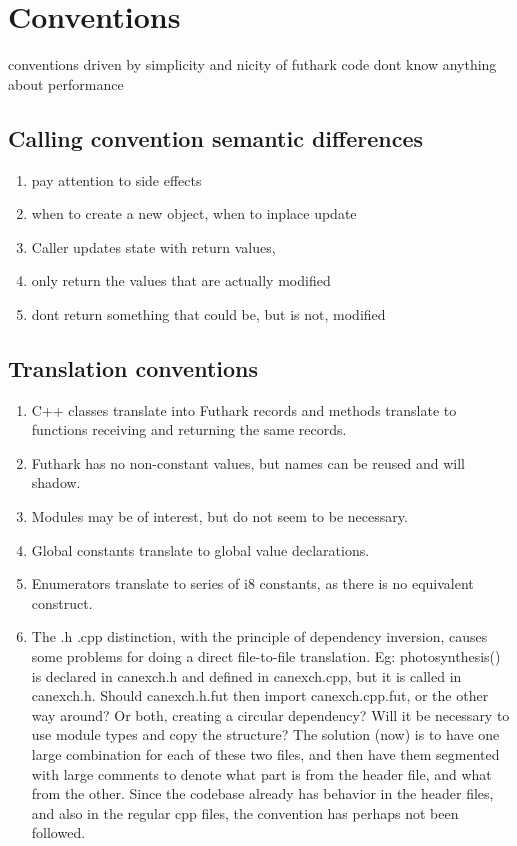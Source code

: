 \section{Conventions}
conventions driven by simplicity and nicity of futhark code
dont know anything about performance

\subsection*{Calling convention semantic differences}
\begin{enumerate}
  \item pay attention to side effects
  \item when to create a new object, when to inplace update
  \item Caller updates state with return values,
  \item only return the values that are actually modified
  \item dont return something that could be, but is not, modified
\end{enumerate}

\subsection*{Translation conventions}\cite{smallarraysbad} \cite{futhark}
\begin{enumerate}
  \item C++ classes translate into Futhark records and methods translate to functions receiving and returning the same records.
  \item Futhark has no non-constant values, but names can be reused and will shadow.
  \item Modules may be of interest, but do not seem to be necessary.
  \item Global constants translate to global value declarations.
  \item Enumerators translate to series of i8 constants, as there is no equivalent construct.
  \item The .h .cpp distinction, with the principle of dependency inversion, causes some problems for doing a direct file-to-file translation. Eg: photosynthesis() is declared in canexch.h and defined in canexch.cpp, but it is called in canexch.h. Should canexch.h.fut then import canexch.cpp.fut, or the other way around? Or both, creating a circular dependency? Will it be necessary to use module types and copy the structure? The solution (now) is to have one large combination for each of these two files, and then have them segmented with large comments to denote what part is from the header file, and what from the other. Since the codebase already has behavior in the header files, and also in the regular cpp files, the convention has perhaps not been followed.
\end{enumerate}

